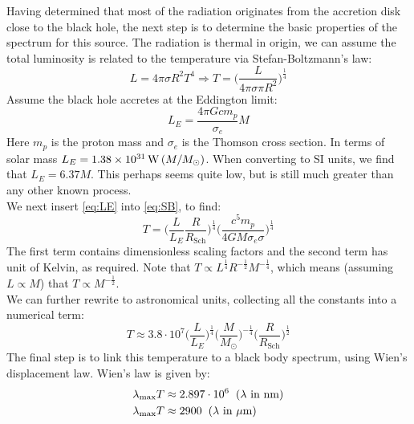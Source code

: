 \documentclass[11pt]{article}
\begin{document}
\clearpage
\noindent Having determined that most of the radiation originates from the accretion disk close to the black hole, the next step is to determine the basic properties of the spectrum for this source. The radiation is thermal in origin, we can assume the total luminosity is related to the temperature via Stefan-Boltzmann's law:
\begin{equation}
	L = 4\pi \sigma  R^2 T^4 \Rightarrow T = \Big(\frac{L}{4\pi\sigma \pi R^{2}}\Big)^{\frac{1}{4}}
	\label{eq:SB}
\end{equation}
Assume the black hole accretes at the Eddington limit:
\begin{equation}
	L_E = \frac{4\pi G c m_p}{\sigma_e} M
	\label{eq:LE}
\end{equation}
Here $m_p$ is the proton mass and $\sigma_e$ is the Thomson cross section. In terms of solar mass $L_E = 1.38\times10^{31} \, {\rm W} \, (M / M_{\odot})$. When converting to SI units, we find that $L_E = 6.37M$. This perhaps seems quite low, but is still much greater than any other known process.\\
We next insert \ref{eq:LE} into \ref{eq:SB}, to find:
\begin{equation}
	T = \Bigg(\frac{L}{L_E}\frac{R}{R_{\mathrm{Sch}}}\Bigg)^{\frac{1}{4}}\Bigg(\frac{c^5 m_p}{4GM\sigma_e \sigma}\Bigg)^{\frac{1}{4}}
\end{equation}
The first term contains dimensionless scaling factors and the second term has unit of Kelvin, as required. Note that $T\propto L^{\frac{1}{4}}R^{-\frac{1}{2}}M^{-\frac{1}{4}}$, which means (assuming $L\propto M$) that $T \propto M^{-\frac{1}{2}}$.\\
\indent We can further rewrite to astronomical units, collecting all the constants into a numerical term:
\begin{equation}
	T \approx 3.8\cdot 10^7 \Big(\frac{L}{L_E}\Big)^{\frac{1}{4}}\Big(\frac{M}{M_{\odot}}\Big)^{-\frac{1}{4}}\Big(\frac{R}{R_{\mathrm{Sch}}}\Big)^{\frac{1}{2}}
	\label{eq:T_astro}
\end{equation}
The final step is to link this temperature to a black body spectrum, using Wien's displacement law. Wien's law is given by:
\begin{subequations}
	\begin{align}
		\lambda_{\mathrm{max}}T &\approx 2.897\cdot 10^6 \hspace{2mm} (\lambda \text{ in nm})\\
		\lambda_{\mathrm{max}}T &\approx 2900 \hspace{2mm} (\lambda \text{ in $\mu$m})
	\end{align}
	\label{eq:Wien}
\end{subequations}
\end{document}
